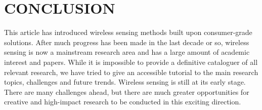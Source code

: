 \section{CONCLUSION}\label{sec:8conc}
This article has introduced wireless sensing methods built upon consumer-grade solutions. After much progress has been made in the last
decade or so, wireless sensing is now a mainstream research area and has a large amount of academic interest and papers. While it is
impossible to provide a definitive cataloguer of all relevant research, we have tried to give an accessible tutorial to the main research
topics, challenges and future trends. Wireless sensing is still at its early stage.  There are many challenges ahead, but there are
much greater opportunities for creative and high-impact research to be conducted in this exciting direction.
